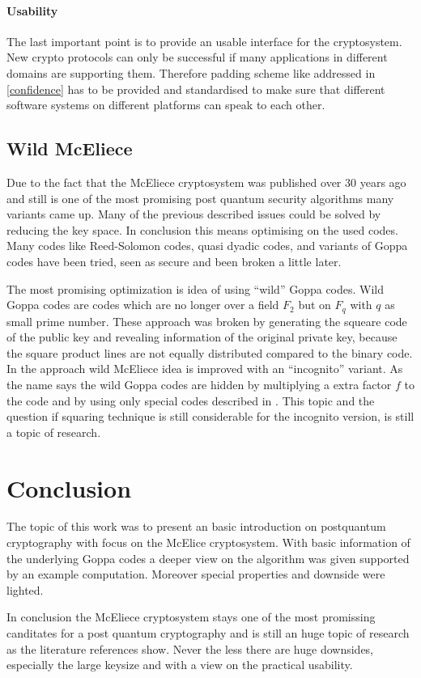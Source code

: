 \paragraph*{Usability}
The last important point is to provide an usable interface for the cryptosystem. New crypto protocols can only be successful if many applications in different domains are supporting them. Therefore padding scheme like addressed in \autoref{confidence} has to be provided and standardised to make sure that different software systems on different platforms can speak to each other. 

\subsection*{Wild McEliece} %
Due to the fact that the McEliece cryptosystem was published over 30 years ago and still is one of the most promising post quantum security algorithms many variants came up. Many of the previous described issues could be solved by reducing the key space. In conclusion this means optimising on the used codes. Many codes like Reed-Solomon codes, quasi dyadic codes, and variants of Goppa codes have been tried, seen as secure and been broken a little later. 

The most promising optimization is idea of using ``wild'' Goppa codes\cite{bernstein2010wild}. Wild Goppa codes are codes which are no longer over a field $F_2$ but on $F_q$ with $q$ as small prime number. These approach was broken by generating the squeare code of the public key and revealing information of the original private key, because the square product lines are not equally distributed compared to the binary code. In \cite{yang2011post} the approach wild McEliece idea is improved with an ``incognito'' variant. As the name says the wild Goppa codes are hidden by multiplying a extra factor $f$ to the code and by using only special codes described in \cite{berger2005mask}. This topic and the question if squaring technique is still considerable for the incognito version, is still a topic of research. 



\section{Conclusion}
The topic of this work was to present an basic introduction on postquantum cryptography with focus on the McElice cryptosystem. With basic information of the underlying Goppa codes a deeper view on the algorithm was given supported by an example computation. Moreover special properties and downside were lighted. 

In conclusion the McEliece cryptosystem stays one of the most promissing canditates for a post quantum cryptography and is still an huge topic of research as the literature references show. Never the less there are huge downsides, especially the large keysize and with a view on the practical usability. 
